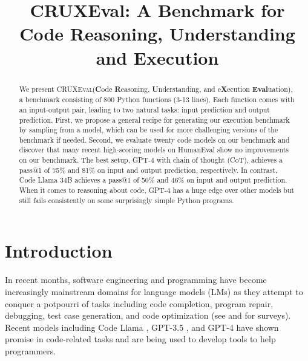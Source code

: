 \documentclass[twoside,11pt,preprint]{article}
\newcommand{\benchmark}{\textsc{CRUXEval}\xspace}
\begin{document}
\title{CRUXEval: A Benchmark for Code Reasoning, Understanding and Execution}



\maketitle

\begin{abstract}
We present \benchmark (\textbf{C}ode \textbf{R}easoning, \textbf{U}nderstanding, and e\textbf{X}ecution \textbf{Eval}uation), a benchmark consisting of 800 Python functions (3-13 lines). Each function comes with an input-output pair, leading to two natural tasks: input prediction and output prediction. First, we propose a general recipe for generating our execution benchmark by sampling from a model, which can be used for more challenging versions of the benchmark if needed. Second, we evaluate twenty code models on our benchmark and discover that many recent high-scoring models on HumanEval show no improvements on our benchmark. The best setup, GPT-4 with chain of thought (CoT), achieves a pass@1 of 75\% and 81\% on input and output prediction, respectively. In contrast, Code Llama 34B achieves a pass@1 of 50\% and 46\% on input and output prediction. When it comes to reasoning about code, GPT-4 has a huge edge over other models but still fails consistently on some surprisingly simple Python programs.
\end{abstract}

\section{Introduction} \label{sec:introduction}
In recent months, software engineering and programming have become increasingly mainstream domains for language models (LMs) as they attempt to conquer a potpourri of tasks including code completion, program repair, debugging, test case generation, and code optimization (see \citet{zan2023large} and \citet{fan2023large} for surveys). Recent models including Code Llama \citep{roziere2023code}, GPT-3.5 \citep{brown2020language, ouyang2022training}, and GPT-4 \citep{openai2023gpt} have shown promise in code-related tasks and are being used to develop tools to help programmers.
\end{document}

